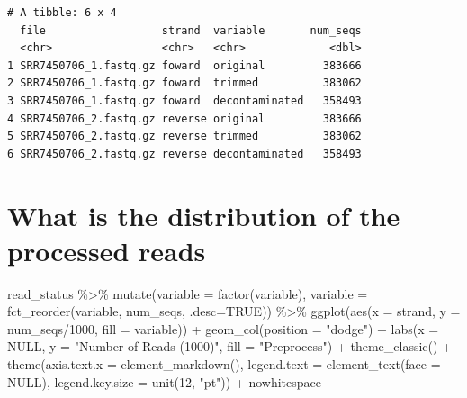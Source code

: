 \documentclass[
  12pt,
  openany]{book}
\newenvironment{Shaded}{\begin{snugshade}}{\end{snugshade}}
\newcommand{\AttributeTok}[1]{\textcolor[rgb]{0.77,0.63,0.00}{#1}}
\newcommand{\ConstantTok}[1]{\textcolor[rgb]{0.00,0.00,0.00}{#1}}
\newcommand{\DecValTok}[1]{\textcolor[rgb]{0.00,0.00,0.81}{#1}}
\newcommand{\FunctionTok}[1]{\textcolor[rgb]{0.00,0.00,0.00}{#1}}
\newcommand{\NormalTok}[1]{#1}
\newcommand{\SpecialCharTok}[1]{\textcolor[rgb]{0.00,0.00,0.00}{#1}}
\newcommand{\StringTok}[1]{\textcolor[rgb]{0.31,0.60,0.02}{#1}}
\begin{document}
\begin{verbatim}
# A tibble: 6 x 4
  file                  strand  variable       num_seqs
  <chr>                 <chr>   <chr>             <dbl>
1 SRR7450706_1.fastq.gz foward  original         383666
2 SRR7450706_1.fastq.gz foward  trimmed          383062
3 SRR7450706_1.fastq.gz foward  decontaminated   358493
4 SRR7450706_2.fastq.gz reverse original         383666
5 SRR7450706_2.fastq.gz reverse trimmed          383062
6 SRR7450706_2.fastq.gz reverse decontaminated   358493
\end{verbatim}

\hypertarget{what-is-the-distribution-of-the-processed-reads}{%
\section{What is the distribution of the processed reads}\label{what-is-the-distribution-of-the-processed-reads}}

\begin{Shaded}
\begin{Highlighting}[]
\NormalTok{read\_status }\SpecialCharTok{\%\textgreater{}\%} 
  \FunctionTok{mutate}\NormalTok{(}\AttributeTok{variable =} \FunctionTok{factor}\NormalTok{(variable),}
         \AttributeTok{variable =} \FunctionTok{fct\_reorder}\NormalTok{(variable, num\_seqs, }\AttributeTok{.desc=}\ConstantTok{TRUE}\NormalTok{)) }\SpecialCharTok{\%\textgreater{}\%} 
  \FunctionTok{ggplot}\NormalTok{(}\FunctionTok{aes}\NormalTok{(}\AttributeTok{x =}\NormalTok{ strand, }\AttributeTok{y =}\NormalTok{ num\_seqs}\SpecialCharTok{/}\DecValTok{1000}\NormalTok{, }\AttributeTok{fill =}\NormalTok{ variable)) }\SpecialCharTok{+}
  \FunctionTok{geom\_col}\NormalTok{(}\AttributeTok{position =} \StringTok{"dodge"}\NormalTok{) }\SpecialCharTok{+}
  \FunctionTok{labs}\NormalTok{(}\AttributeTok{x =} \ConstantTok{NULL}\NormalTok{, }\AttributeTok{y =} \StringTok{"Number of Reads (1000)"}\NormalTok{, }\AttributeTok{fill =} \StringTok{"Preprocess"}\NormalTok{) }\SpecialCharTok{+}
  \FunctionTok{theme\_classic}\NormalTok{() }\SpecialCharTok{+}
  \FunctionTok{theme}\NormalTok{(}\AttributeTok{axis.text.x =} \FunctionTok{element\_markdown}\NormalTok{(),}
        \AttributeTok{legend.text =} \FunctionTok{element\_text}\NormalTok{(}\AttributeTok{face =} \ConstantTok{NULL}\NormalTok{),}
        \AttributeTok{legend.key.size =} \FunctionTok{unit}\NormalTok{(}\DecValTok{12}\NormalTok{, }\StringTok{"pt"}\NormalTok{)) }\SpecialCharTok{+}\NormalTok{ nowhitespace}
\end{Highlighting}
\end{Shaded}
\end{document}
